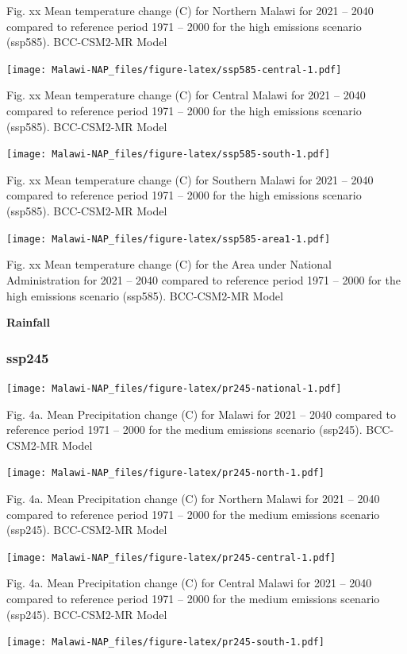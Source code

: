\documentclass[
]{book}
\begin{document}
Fig. xx Mean temperature change (C) for Northern Malawi for 2021 -- 2040 compared to reference period 1971 -- 2000 for the high emissions scenario (ssp585). BCC-CSM2-MR Model

\texttt{[image: Malawi-NAP\_files/figure-latex/ssp585-central-1.pdf]}

Fig. xx Mean temperature change (C) for Central Malawi for 2021 -- 2040 compared to reference period 1971 -- 2000 for the high emissions scenario (ssp585). BCC-CSM2-MR Model

\texttt{[image: Malawi-NAP\_files/figure-latex/ssp585-south-1.pdf]}

Fig. xx Mean temperature change (C) for Southern Malawi for 2021 -- 2040 compared to reference period 1971 -- 2000 for the high emissions scenario (ssp585). BCC-CSM2-MR Model

\texttt{[image: Malawi-NAP\_files/figure-latex/ssp585-area1-1.pdf]}

Fig. xx Mean temperature change (C) for the Area under National Administration for 2021 -- 2040 compared to reference period 1971 -- 2000 for the high emissions scenario (ssp585). BCC-CSM2-MR Model

\textbf{Rainfall}

\hypertarget{ssp245-1}{%
\subsubsection{ssp245}\label{ssp245-1}}

\texttt{[image: Malawi-NAP\_files/figure-latex/pr245-national-1.pdf]}

Fig. 4a. Mean Precipitation change (C) for Malawi for 2021 -- 2040 compared to reference period 1971 -- 2000 for the medium emissions scenario (ssp245). BCC-CSM2-MR Model

\texttt{[image: Malawi-NAP\_files/figure-latex/pr245-north-1.pdf]}

Fig. 4a. Mean Precipitation change (C) for Northern Malawi for 2021 -- 2040 compared to reference period 1971 -- 2000 for the medium emissions scenario (ssp245). BCC-CSM2-MR Model

\texttt{[image: Malawi-NAP\_files/figure-latex/pr245-central-1.pdf]}

Fig. 4a. Mean Precipitation change (C) for Central Malawi for 2021 -- 2040 compared to reference period 1971 -- 2000 for the medium emissions scenario (ssp245). BCC-CSM2-MR Model

\texttt{[image: Malawi-NAP\_files/figure-latex/pr245-south-1.pdf]}
\end{document}
